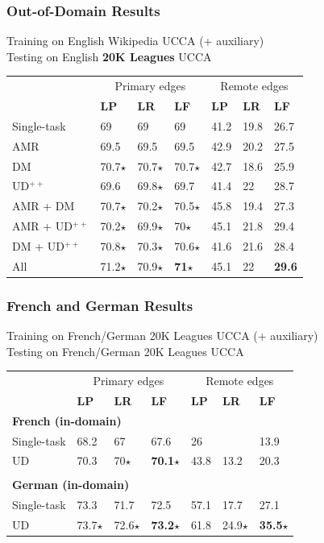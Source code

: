 \documentclass[t,xcolor={svgnames}]{beamer}
\begin{document}
\begin{frame}
\frametitle{Out-of-Domain Results}
Training on English Wikipedia UCCA (+ auxiliary) \\ Testing on English \textbf{20K Leagues} UCCA
\begin{center}
	\begin{tabular}{l|lll|lll}
	& \multicolumn{3}{c|}{Primary edges} & \multicolumn{3}{c}{Remote edges} \\
	& \textbf{LP} & \textbf{LR} & \textbf{LF}
	& \textbf{LP} & \textbf{LR} & \textbf{LF} \\
	\hline
	Single-task
	& 69 & 69 & 69 & 41.2 & 19.8 & 26.7 \\
	\cline{1-1}
	AMR
	& 69.5 & 69.5 & 69.5 & 42.9 & 20.2 & 27.5 \\
	DM
	& 70.7$\star$ & 70.7$\star$ & 70.7$\star$ & 42.7 & 18.6 & 25.9 \\
	UD$^{++}$
	& 69.6 & 69.8$\star$ & 69.7 & 41.4 & 22 & 28.7 \\
	AMR + DM
	& 70.7$\star$ & 70.2$\star$ & 70.5$\star$ & 45.8 & 19.4 & 27.3 \\
	AMR + UD$^{++}$
	& 70.2$\star$ & 69.9$\star$ & 70$\star$ & 45.1 & 21.8 & 29.4 \\
	DM + UD$^{++}$
	& 70.8$\star$ & 70.3$\star$ & 70.6$\star$ & 41.6 & 21.6 & 28.4 \\
	All
	& 71.2$\star$ & 70.9$\star$ & \textbf{71}$\star$ & 45.1 & 22 & \textbf{29.6}
	\end{tabular}
\end{center}
\end{frame}

\begin{frame}
\frametitle{French and German Results}
Training on French/German 20K Leagues UCCA (+ auxiliary) \\ Testing on French/German 20K Leagues UCCA
\begin{center}
	\begin{tabular}{l|lll|lll}
	& \multicolumn{3}{c|}{Primary edges} & \multicolumn{3}{c}{Remote edges} \\
	& \textbf{LP} & \textbf{LR} & \textbf{LF}
	& \textbf{LP} & \textbf{LR} & \textbf{LF} \\
	\hline
	\multicolumn{4}{l|}{\bf French (in-domain)} & \\
	Single-task & 68.2 & 67 & 67.6 & 26 & \enskip 9.4 & 13.9 \\
	UD & 70.3 & 70$\star$ & \textbf{70.1}$\star$ & 43.8 & 13.2 & 20.3 \\
	\hline\\
	\multicolumn{4}{l|}{\bf German (in-domain)} & \\
	Single-task & 73.3 & 71.7 & 72.5 & 57.1 & 17.7 & 27.1 \\
	UD & 73.7$\star$ & 72.6$\star$ & \textbf{73.2}$\star$ & 61.8 & 24.9$\star$ & \textbf{35.5}$\star$
	\end{tabular}
\end{center}
\end{frame}
\end{document}
